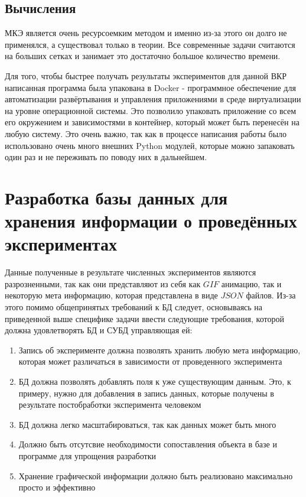 \documentclass[14pt]{extreport}
\begin{document}
\section{Вычисления}

МКЭ является очень ресурсоемким методом и именно из-за этого он долго не применялся, а существовал только в теории. Все современные задачи считаются на больших сетках и занимает это достаточно большое количество времени.

Для того, чтобы быстрее получать результаты экспериментов для данной ВКР написанная программа была упакована в Docker - программное обеспечение для автоматизации развёртывания и управления приложениями в среде виртуализации на уровне операционной системы. Это позволило упаковать приложение со всем его окружением и зависимостями в контейнер, который может быть перенесён на любую систему. Это очень важно, так как в процессе написания работы было использовано очень много внешних Python модулей, которые можно запаковать один раз и не переживать по поводу них в дальнейшем.


\chapter{Разработка базы данных для хранения информации о проведённых экспериментах}

Данные полученные в результате численных экспериментов являются разрозненными, так как они представляют из себя как $GIF$ анимацию, так и некоторую мета информацию, которая представлена в виде $JSON$ файлов. Из-за этого помимо общепринятых требований к БД следует, основываясь на приведенной выше специфике задачи ввести следующие требования, которой должна удовлетворять БД и СУБД управляющая ей:

\begin{enumerate}

\item Запись об эксперименте должна позволять хранить любую мета информацию, которая может различаться в зависимости от проведенного эксперимента

\item БД должна позволять добавлять поля к уже существующим данным. Это, к примеру, нужно для добавления в запись данных, которые получены в результате постобработки эксперимента человеком

\item БД должна легко масштабироваться, так как данных может быть много

\item Должно быть отсутсвие необходимости сопоставления объекта в базе и программе для упрощения разработки

\item Хранение графической информации должно быть реализовано максимально просто и эффективно

\end{enumerate}
\end{document}
